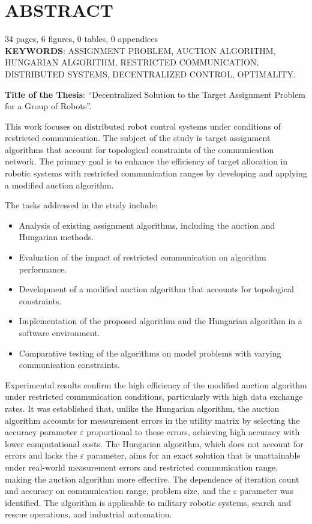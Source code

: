 \newpage

\chapter*{ABSTRACT}

34 pages, 6 figures, 0 tables, 0 appendices \\

\textbf{KEYWORDS}: ASSIGNMENT PROBLEM, AUCTION ALGORITHM, HUNGARIAN ALGORITHM, RESTRICTED COMMUNICATION, DISTRIBUTED SYSTEMS, DECENTRALIZED CONTROL, OPTIMALITY.

\textbf{Title of the Thesis}: ``Decentralized Solution to the Target Assignment Problem for a Group of Robots''.

This work focuses on distributed robot control systems under conditions of restricted communication. The subject of the study is target assignment algorithms that account for topological constraints of the communication network. The primary goal is to enhance the efficiency of target allocation in robotic systems with restricted communication ranges by developing and applying a modified auction algorithm.

The tasks addressed in the study include:
\begin{itemize}
	\item Analysis of existing assignment algorithms, including the auction and Hungarian methods.
	\item Evaluation of the impact of restricted communication on algorithm performance.
	\item Development of a modified auction algorithm that accounts for topological constraints.
	\item Implementation of the proposed algorithm and the Hungarian algorithm in a software environment.
	\item Comparative testing of the algorithms on model problems with varying communication constraints.
\end{itemize}

Experimental results confirm the high efficiency of the modified auction algorithm under restricted communication conditions, particularly with high data exchange rates. It was established that, unlike the Hungarian algorithm, the auction algorithm accounts for measurement errors in the utility matrix by selecting the accuracy parameter $\varepsilon$ proportional to these errors, achieving high accuracy with lower computational costs. The Hungarian algorithm, which does not account for errors and lacks the $\varepsilon$ parameter, aims for an exact solution that is unattainable under real-world measurement errors and restricted communication range, making the auction algorithm more effective. The dependence of iteration count and accuracy on communication range, problem size, and the $\varepsilon$ parameter was identified. The algorithm is applicable to military robotic systems, search and rescue operations, and industrial automation.